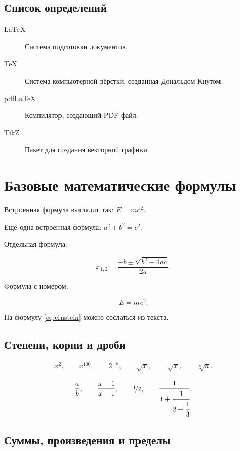 \documentclass[12pt,a4paper]{article}
\theoremstyle{definition}
\theoremstyle{remark}
\begin{document}
\subsection{Список определений}

\begin{description}
    \item[\LaTeX] Система подготовки документов.
    \item[TeX] Система компьютерной вёрстки, созданная Дональдом Кнутом.
    \item[pdfLaTeX] Компилятор, создающий PDF-файл.
    \item[TikZ] Пакет для создания векторной графики.
\end{description}


\section{Базовые математические формулы}

Встроенная формула выглядит так: $E = mc^2$.

Ещё одна встроенная формула:
$a^2+b^2=c^2$.

Отдельная формула:

\[
    x_{1,2}
    =
    \frac{-b\pm\sqrt{b^2-4ac}}{2a}.
\]

Формула с номером:

\begin{equation}
    \label{eq:einstein}
    E=mc^2.
\end{equation}

На формулу \eqref{eq:einstein} можно сослаться из текста.

\subsection{Степени, корни и дроби}

\[
    x^2,\qquad
    x^{100},\qquad
    2^{-5},\qquad
    \sqrt{x},\qquad
    \sqrt[3]{x},\qquad
    \sqrt[n]{a}.
\]

\[
    \frac{a}{b},
    \qquad
    \dfrac{x+1}{x-1},
    \qquad
    \nicefrac{1}{2},
    \qquad
    \cfrac{1}{
        1+\cfrac{1}{
            2+\cfrac{1}{3}
        }
    }.
\]

\subsection{Суммы, произведения и пределы}
\end{document}
